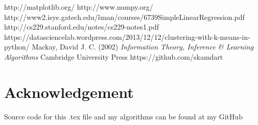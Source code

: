 \documentclass[12pt]{article}
\begin{document}
\begin{thebibliography}{9}
http://matplotlib.org/
http://www.numpy.org/
http://www2.isye.gatech.edu/\~sman/courses/6739SimpleLinearRegression.pdf
http://cs229.stanford.edu/notes/cs229-notes1.pdf
https://datasciencelab.wordpress.com/2013/12/12/clustering-with-k-means-in-python/
Mackay, David J. C. (2002) \emph{Information Theory, Inference \& Learning Algorithms} Cambridge University Press
https://github.com/skamdart
\end{thebibliography}

\section*{Acknowledgement}
Source code for this .tex file and my algorithms can be found at my GitHub \cite{Github}
\end{document}
